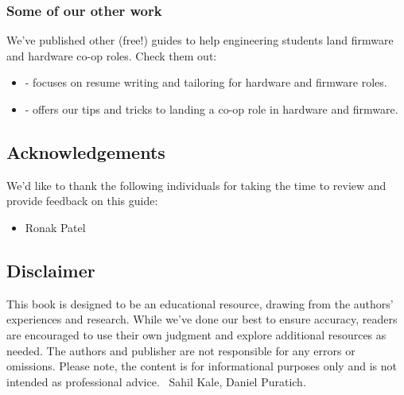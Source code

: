 \documentclass[main.tex]{subfiles}
\begin{document}
\subsubsection{Some of our other work}
We've published other (free!) guides to help engineering students land firmware and hardware co-op roles. Check them out:
\begin{itemize}
    \item {} - focuses on resume writing and tailoring for hardware and firmware roles.
    \item {} - offers our tips and tricks to landing a co-op role in hardware and firmware.
\end{itemize}


\subsection{Acknowledgements}
We'd like to thank the following individuals for taking the time to review and provide feedback on this guide:
\begin{itemize}
    \item Ronak Patel
\end{itemize}

\subsection{Disclaimer}
This book is designed to be an educational resource, drawing from the authors' experiences and research. While we've done our best to ensure accuracy, readers are encouraged to use their own judgment and explore additional resources as needed. The authors and publisher are not responsible for any errors or omissions. Please note, the content is for informational purposes only and is not intended as professional advice.
\newline
\newnoindentpara \textcopyright \ Sahil Kale, Daniel Puratich.
\end{document}
